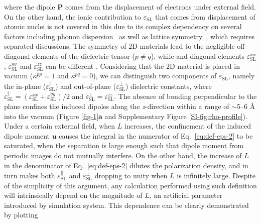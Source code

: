 where the dipole $\boldsymbol{P}$ comes from the displacement of
electrons under external field.  On the other hand, the ionic
contribution to $\varepsilon_{\mathrm{SL}}$ that comes from
displacement of atomic nuclei is not covered in this due to its
complex dependency on several factors including phonon
dispersion~\cite{Sohier_2017} as well as lattice
symmetry~\cite{Laturia_2018}, which requires separated discussions.
The symmetry of 2D materials lead to the negligible off-diagonal
elements of the dielectric tensor ($p \neq q$), while and diagonal
elements $\varepsilon_{\mathrm{SL}}^{xx}$,
$\varepsilon_{\mathrm{SL}}^{yy}$ and $\varepsilon_{\mathrm{SL}}^{zz}$
can be different \cite{Sohier_2016}.  Considering that the 2D material
is placed in vacuum ($\kappa^{pp} = 1$ and $\kappa^{pq} = 0$), we can
distinguish two components of $\varepsilon_{\mathrm{SL}}$, namely the
in-plane ($\varepsilon_{\mathrm{SL}}^{\parallel}$) and out-of-plane
($\varepsilon_{\mathrm{SL}}^{\perp}$) dielectric constants, where
$\varepsilon_{\mathrm{SL}}^{\parallel} =
(\varepsilon_{\mathrm{SL}}^{xx} + \varepsilon_{\mathrm{SL}}^{yy})/2$
and
$\varepsilon_{\mathrm{SL}}^{\perp} = \varepsilon_{\mathrm{SL}}^{zz}$.
The absence of bonding perpendicular to the plane confines the induced
dipoles along the \textit{z}-direction within a range of $\sim{}$5--6
\AA{} into the vacuum (Figure \ref{fig-1}{\textbf a} and Supplementary
Figure \ref{SI-fig:rho-profile}).
%
%
Under a certain external field, when $L$ increases, the confinement of
the induced dipole moment $\boldsymbol{u}$ causes the integral in the
numerator of Eq.~\ref{eq:def-eps-2} to be saturated, when the
separation is large enough such that dipole moment from periodic
images do not mutually interfere. On the other hand, the increase of
$L$ in the denominator of Eq.~\ref{eq:def-eps-2} dilutes the polarization density, and in turn makes both
$\varepsilon^{\parallel}_{\mathrm{SL}}$ and
$\varepsilon^{\perp}_{\mathrm{SL}}$ dropping to
unity when $L$ is infinitely large.
%
%
%
Despite of the simplicity of this argument, any calculation performed
using such definition will intrinsically depend on the magnitude of
$L$, an artificial parameter introduced by simulation system. This
dependence can be clearly demonstrated by plotting
